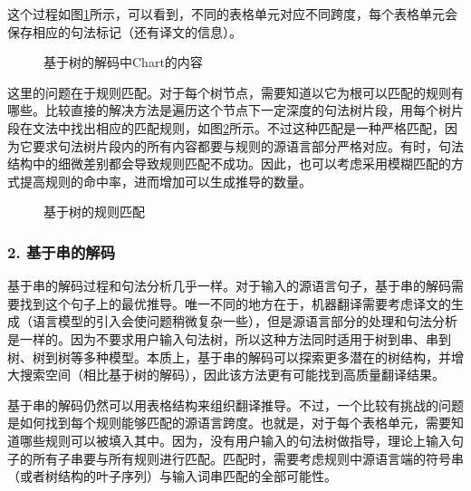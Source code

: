 \parinterval 这个过程如图\ref{fig:8-41}所示，可以看到，不同的表格单元对应不同跨度，每个表格单元会保存相应的句法标记（还有译文的信息）。

\begin{figure}[htp]
\centering

\caption{基于树的解码中Chart的内容}
\label{fig:8-41}
\end{figure}

\parinterval 这里的问题在于规则匹配。对于每个树节点，需要知道以它为根可以匹配的规则有哪些。比较直接的解决方法是遍历这个节点下一定深度的句法树片段，用每个树片段在文法中找出相应的匹配规则，如图\ref{fig:8-42}所示。不过这种匹配是一种严格匹配，因为它要求句法树片段内的所有内容都要与规则的源语言部分严格对应。有时，句法结构中的细微差别都会导致规则匹配不成功。因此，也可以考虑采用模糊匹配的方式提高规则的命中率，进而增加可以生成推导的数量。

\begin{figure}[htp]
\centering

\caption{基于树的规则匹配}
\label{fig:8-42}
\end{figure}


\subsubsection{2. 基于串的解码}

\parinterval 基于串的解码过程和句法分析几乎一样。对于输入的源语言句子，基于串的解码需要找到这个句子上的最优推导。唯一不同的地方在于，机器翻译需要考虑译文的生成（语言模型的引入会使问题稍微复杂一些），但是源语言部分的处理和句法分析是一样的。因为不要求用户输入句法树，所以这种方法同时适用于树到串、串到树、树到树等多种模型。本质上，基于串的解码可以探索更多潜在的树结构，并增大搜索空间（相比基于树的解码），因此该方法更有可能找到高质量翻译结果。

\parinterval 基于串的解码仍然可以用表格结构来组织翻译推导。不过，一个比较有挑战的问题是如何找到每个规则能够匹配的源语言跨度。也就是，对于每个表格单元，需要知道哪些规则可以被填入其中。因为，没有用户输入的句法树做指导，理论上输入句子的所有子串要与所有规则进行匹配。匹配时，需要考虑规则中源语言端的符号串（或者树结构的叶子序列）与输入词串匹配的全部可能性。

